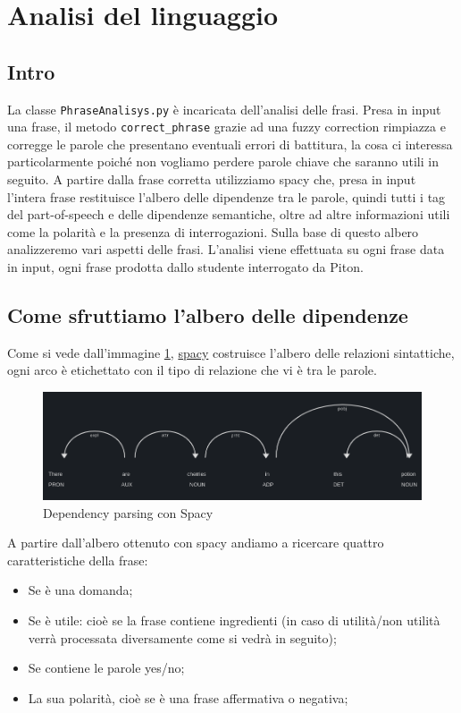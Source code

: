 \section{Analisi del linguaggio}
\subsection{Intro}
La classe \texttt{PhraseAnalisys.py} è incaricata dell'analisi delle frasi.
Presa in input una frase, il metodo \texttt{correct\_phrase} grazie ad una fuzzy correction rimpiazza e corregge le parole che presentano eventuali errori di battitura, la cosa ci interessa particolarmente poiché non vogliamo perdere parole chiave che saranno utili in seguito.
A partire dalla frase corretta  utilizziamo spacy che, presa in input l'intera frase restituisce l'albero delle dipendenze tra le parole, quindi tutti i tag del part-of-speech e delle dipendenze semantiche, oltre ad altre informazioni utili come la polarità e la presenza di interrogazioni. Sulla base di questo albero analizzeremo vari aspetti delle frasi. L'analisi viene effettuata su ogni frase data in input, ogni frase prodotta dallo studente interrogato da Piton.
\subsection{Come sfruttiamo l'albero delle dipendenze}
Come si vede dall'immagine \ref{fig:Spacy}, \href{https://spacy.io/}{spacy} costruisce l'albero delle relazioni sintattiche, ogni arco è etichettato con il tipo di relazione che vi è tra le parole.
\begin{figure}[h]
    \centering
    \includegraphics[scale=0.45]{Images/imgSpacy.png}
    \caption{Dependency parsing con Spacy}
    \label{fig:Spacy}
\end{figure}
A partire dall'albero ottenuto con spacy andiamo a ricercare quattro caratteristiche della frase:
\begin{itemize}
    \item Se è una domanda;
    \item Se è utile: cioè se la frase contiene ingredienti (in caso di utilità/non utilità verrà processata diversamente come si vedrà in seguito);
    \item Se contiene le parole yes/no;
    \item La sua polarità, cioè se è una frase affermativa o negativa;
\end{itemize}

